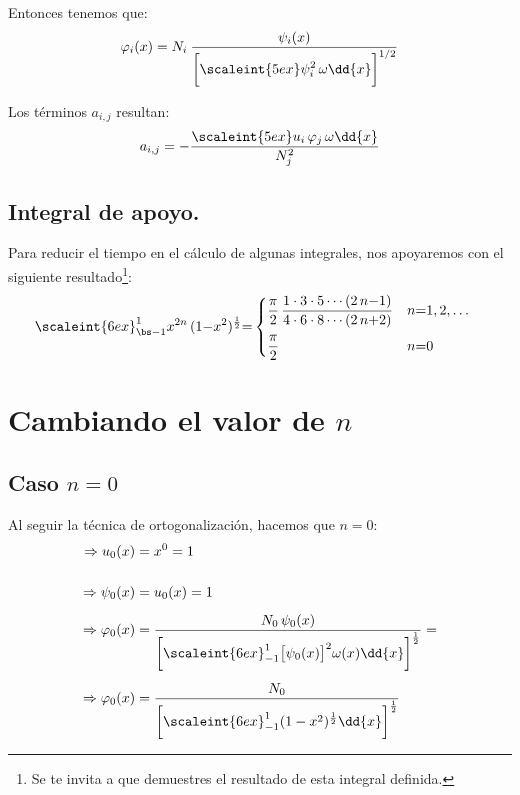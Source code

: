 Entonces tenemos que:
\begin{align*}
\varphi_{i} (x) =  N_{i} \: \dfrac{\psi_{i} (x)}{ \bigg[ \displaystyle \scaleint{5ex} \psi_{i}^{2} \, \omega \dd{x} \bigg]^{1/2}}
\end{align*}

Los términos $a_{i,j}$ resultan:
\begin{align}
a_{i, j} = - \dfrac{ \displaystyle \scaleint{5ex} u_{i} \, \varphi_{j} \, \omega \dd{x}}{N_{j}^{2}}
\label{eq:ecuacion_10_49a}
\end{align}
    

\subsection*{Integral de apoyo.}

Para reducir el tiempo en el cálculo de algunas integrales, nos apoyaremos con el siguiente resultado\footnote{Se te invita a que demuestres el resultado de esta integral definida.}:
\begin{align*}
\scaleint{6ex}_{\bs -1}^{1} &x^{2n} \, (1 {-} x^{2})^{\frac{1}{2}} {=} \begin{cases}
\dfrac{\pi}{2} \, \dfrac{1 \cdot 3 \cdot 5 \cdots (2 \, n {-} 1)}{4 \cdot 6 \cdot 8 \cdots (2 \, n {+} 2)} & n {=} 1, 2, \ldots \\[1em]
\dfrac{\pi}{2} & n {=} 0
\end{cases}
\end{align*}

\section{Cambiando el valor de \texorpdfstring{$n$}{n}}
\subsection{Caso \texorpdfstring{$n=0$}{n=0}}

Al seguir la técnica de ortogonalización, hacemos que $n = 0$:
\begin{align*}
\Rightarrow u_{0} (x) &= x^{0} = 1 \\[0.5cm] 
\Rightarrow \psi_{0} (x) &= u_{0} (x) = 1 \\[0.5em] 
\Rightarrow \varphi_{0} (x) &= \dfrac{N_{0} \, \psi_{0} (x)}{\bigg[ \scaleint{6ex}_{-1}^{1} \big[ \psi_{0} (x) \big]^{2} \omega (x) \dd{x} \bigg]^{\frac{1}{2}}} = \\[0.5em]
\Rightarrow \varphi_{0} (x) &= \dfrac{N_{0}}{\bigg[ \scaleint{6ex}_{-1}^{1} (1 -x^{2})^{\frac{1}{2}} \dd{x} \bigg]^{\frac{1}{2}}}
\end{align*}

